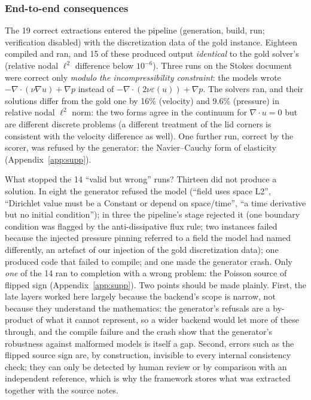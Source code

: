 \subsubsection{End-to-end consequences}
\label{sec:e2e}
The 19 correct extractions entered the pipeline (generation, build, run; verification disabled) with the discretization data of the gold instance. Eighteen compiled and ran, and 15 of these produced output \emph{identical} to the gold solver's (relative nodal $\ell^2$ difference below $10^{-6}$). Three runs on the Stokes document were correct only \emph{modulo the incompressibility constraint}: the models wrote $-\nabla\cdot(\nu\nabla u)+\nabla p$ instead of $-\nabla\cdot(2\nu\varepsilon(u))+\nabla p$. The solvers ran, and their solutions differ from the gold one by 16\% (velocity) and 9.6\% (pressure) in relative nodal $\ell^2$ norm: the two forms agree in the continuum for $\nabla\cdot u=0$ but are different discrete problems (a different treatment of the lid corners is consistent with the velocity difference as well). One further run, correct by the scorer, was refused by the generator: the Navier--Cauchy form of elasticity (Appendix~\ref{app:supp}).

What stopped the 14 ``valid but wrong'' runs? Thirteen did not produce a solution. In eight the generator refused the model (``field  uses space L2'', ``Dirichlet value must be a Constant or depend on space/time'', ``a time derivative but no initial condition''); in three the pipeline's  stage rejected it (one boundary condition was flagged by the anti-dissipative flux rule; two instances failed because the injected pressure pinning referred to a field the model had named differently, an artefact of our injection of the gold discretization data); one produced code that failed to compile; and one made the generator crash. Only \emph{one} of the 14 ran to completion with a wrong problem: the Poisson source of flipped sign (Appendix~\ref{app:supp}). Two points should be made plainly. First, the late layers worked here largely because the backend's scope is narrow, not because they understand the mathematics: the generator's refusals are a by-product of what it cannot represent, so a wider backend would let more of these through, and the compile failure and the crash show that the generator's robustness against malformed models is itself a gap. Second, errors such as the flipped source sign are, by construction, invisible to every internal consistency check; they can only be detected by human review or by comparison with an independent reference, which is why the framework stores what was extracted together with the source notes.

